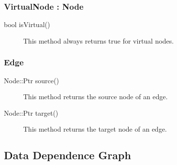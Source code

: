 \documentclass[12pt,titlepage]{article}
\begin{document}
\subsubsection{VirtualNode : Node}
\begin{description}
\item[bool isVirtual()]
This method always returns true for virtual nodes.
\end{description}

\subsubsection{Edge}
\begin{description}
\item[Node::Ptr source()]
This method returns the source node of an edge.
\item[Node::Ptr target() ]
This method returns the target node of an edge.
\end{description}

\subsection{Data Dependence Graph}
\end{document}
